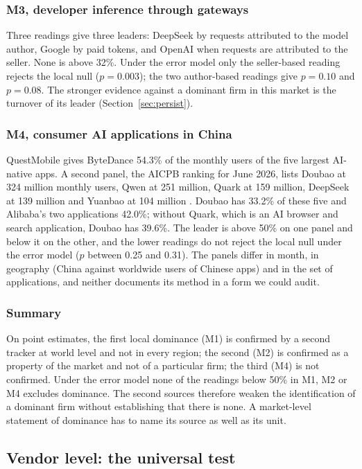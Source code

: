 \documentclass[11pt]{article}
\begin{document}
\subsubsection{M3, developer inference through gateways} Three readings give three leaders: DeepSeek by requests attributed to the model author, Google by paid tokens, and OpenAI when requests are attributed to the seller. None is above 32\%. Under the error model only the seller-based reading rejects the local null ($p=0.003$); the two author-based readings give $p=0.10$ and $p=0.08$. The stronger evidence against a dominant firm in this market is the turnover of its leader (Section~\ref{sec:persist}).

\subsubsection{M4, consumer AI applications in China} QuestMobile gives ByteDance 54.3\% of the monthly users of the five largest AI-native apps. A second panel, the AICPB ranking for June 2026, lists Doubao at 324 million monthly users, Qwen at 251 million, Quark at 159 million, DeepSeek at 139 million and Yuanbao at 104 million \cite{aicpb2026june}. Doubao has 33.2\% of these five and Alibaba's two applications 42.0\%; without Quark, which is an AI browser and search application, Doubao has 39.6\%. The leader is above 50\% on one panel and below it on the other, and the lower readings do not reject the local null under the error model ($p$ between 0.25 and 0.31). The panels differ in month, in geography (China against worldwide users of Chinese apps) and in the set of applications, and neither documents its method in a form we could audit.

\subsubsection{Summary} On point estimates, the first local dominance (M1) is confirmed by a second tracker at world level and not in every region; the second (M2) is confirmed as a property of the market and not of a particular firm; the third (M4) is not confirmed. Under the error model none of the readings below 50\% in M1, M2 or M4 excludes dominance. The second sources therefore weaken the identification of a dominant firm without establishing that there is none. A market-level statement of dominance has to name its source as well as its unit.


\subsection{Vendor level: the universal test}
\label{sec:vendor}
\end{document}
